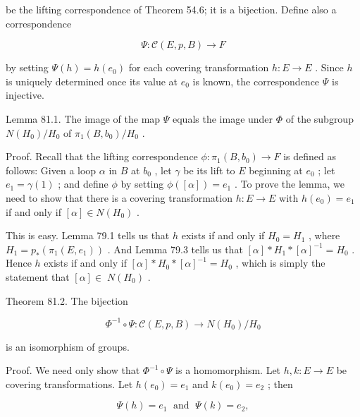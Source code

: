 \documentclass[10pt]{article}
\begin{document}
be the lifting correspondence of Theorem 54.6; it is a bijection. Define also a correspondence

\[
\Psi  : \mathcal{C}\left( {E,p,B}\right)  \rightarrow  F
\]

by setting \(\Psi \left( h\right)  = h\left( {e}_{0}\right)\) for each covering transformation \(h : E \rightarrow  E\) . Since \(h\) is uniquely determined once its value at \({e}_{0}\) is known, the correspondence \(\Psi\) is injective.

Lemma 81.1. The image of the map \(\Psi\) equals the image under \(\Phi\) of the subgroup \(N\left( {H}_{0}\right) /{H}_{0}\) of \({\pi }_{1}\left( {B,{b}_{0}}\right) /{H}_{0}\) .

Proof. Recall that the lifting correspondence \(\phi  : {\pi }_{1}\left( {B,{b}_{0}}\right)  \rightarrow  F\) is defined as follows: Given a loop \(\alpha\) in \(B\) at \({b}_{0}\) , let \(\gamma\) be its lift to \(E\) beginning at \({e}_{0}\) ; let \({e}_{1} = \gamma \left( 1\right)\) ; and define \(\phi\) by setting \(\phi \left( \left\lbrack  \alpha \right\rbrack  \right)  = {e}_{1}\) . To prove the lemma, we need to show that there is a covering transformation \(h : E \rightarrow  E\) with \(h\left( {e}_{0}\right)  = {e}_{1}\) if and only if \(\left\lbrack  \alpha \right\rbrack   \in  N\left( {H}_{0}\right)\) .

This is easy. Lemma 79.1 tells us that \(h\) exists if and only if \({H}_{0} = {H}_{1}\) , where \({H}_{1} = {p}_{ * }\left( {{\pi }_{1}\left( {E,{e}_{1}}\right) }\right)\) . And Lemma 79.3 tells us that \(\left\lbrack  \alpha \right\rbrack   * {H}_{1} * {\left\lbrack  \alpha \right\rbrack  }^{-1} = {H}_{0}\) . Hence \(h\) exists if and only if \(\left\lbrack  \alpha \right\rbrack   * {H}_{0} * {\left\lbrack  \alpha \right\rbrack  }^{-1} = {H}_{0}\) , which is simply the statement that \(\left\lbrack  \alpha \right\rbrack   \in \; N\left( {H}_{0}\right)\) .

Theorem 81.2. The bijection

\[
{\Phi }^{-1} \circ  \Psi  : \mathcal{C}\left( {E,p,B}\right)  \rightarrow  N\left( {H}_{0}\right) /{H}_{0}
\]

is an isomorphism of groups.

Proof. We need only show that \({\Phi }^{-1} \circ  \Psi\) is a homomorphism. Let \(h,k : E \rightarrow  E\) be covering transformations. Let \(h\left( {e}_{0}\right)  = {e}_{1}\) and \(k\left( {e}_{0}\right)  = {e}_{2}\) ; then

\[
\Psi \left( h\right)  = {e}_{1}\;\text{ and }\;\Psi \left( k\right)  = {e}_{2},
\]
\end{document}
